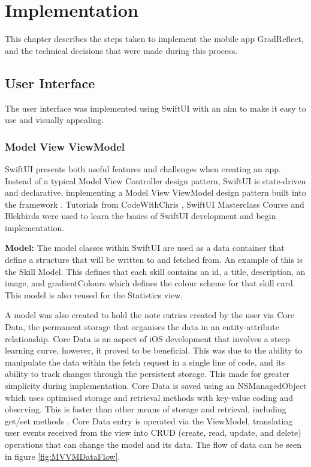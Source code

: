 \documentclass{l4proj}
\begin{document}
\chapter{Implementation} \label{implementation}

This chapter describes the steps taken to implement the mobile app GradReflect, and the technical decisions that were made during this process.

\section{User Interface}

The user interface was implemented using SwiftUI with an aim to make it easy to use and visually appealing. 

\subsection{Model View ViewModel}

SwiftUI presents both useful features and challenges when creating an app. Instead of a typical Model View Controller design pattern, SwiftUI is state-driven and declarative, implementing a Model View ViewModel design pattern built into the framework \citep{naumov_swiftui_architecture_2019}. Tutorials from CodeWithChris \citep{ching_codewithchris_2021}, SwiftUI Masterclass Course \citep{petras_swiftui_2021} and Blckbirds \citep{blckbirds_learn_2021} were used to learn the basics of SwiftUI development and begin implementation.

\textbf{Model:} The model classes within SwiftUI are used as a data container that define a structure that will be written to and fetched from. An example of this is the Skill Model. This defines that each skill contains an id, a title, description, an image, and gradientColours which defines the colour scheme for that skill card. This model is also reused for the Statistics view.

A model was also created to hold the note entries created by the user via Core Data, the permanent storage that organises the data in an entity-attribute relationship. Core Data is an aspect of iOS development that involves a steep learning curve, however, it proved to be beneficial. This was due to the ability to manipulate the data within the fetch request in a single line of code, and its ability to track changes through the persistent storage. This made for greater simplicity during implementation. Core Data is saved using an NSManagedObject which uses optimised storage and retrieval methods with key-value coding and observing. This is faster than other means of storage and retrieval, including get/set methods \citep{apple_developer_documentation_core_2021}. Core Data entry is operated via the ViewModel, translating user events received from the view into CRUD (create, read, update, and delete) operations that can change the model and its data. The flow of data can be seen in figure \ref{fig:MVVMDataFlow}. 
\end{document}
